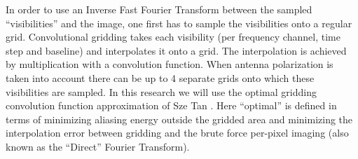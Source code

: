 \documentclass[a4paper, two column]{article}
\begin{document}
 In order to use an Inverse Fast Fourier Transform between the sampled ``visibilities'' and the image, one first has to sample the visibilities onto a regular grid. Convolutional gridding takes each visibility (per frequency channel, time step and baseline) 
 and interpolates it onto a grid. The interpolation is achieved by multiplication with a convolution function. When antenna polarization is taken into account there can be up to 4 separate grids onto which these visibilities are sampled. In this research we will
 use the optimal gridding convolution function approximation of Sze Tan \cite{tan1986aperture}. Here ``optimal'' is defined in terms of minimizing aliasing energy outside the gridded area and minimizing the interpolation error between gridding and the brute force per-pixel
 imaging (also known as the ``Direct'' Fourier Transform).
 
\end{document}
